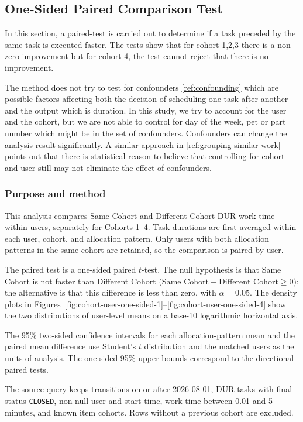 \subsection{One-Sided Paired Comparison Test} \label{cohort-user-one-sided-comparison}
In this section, a paired-test is carried out to determine if a task
preceded by the same task is executed faster.  The tests show that for
cohort 1,2,3 there is a non-zero improvement but for cohort 4, the
test cannot reject that there is no improvement.

The method does not try to test for confounders \ref{ref:confounding}
which are possible factors affecting both the decision of scheduling
one task after another and the output which is duration. In this
study, we try to account for the user and the cohort, but we are not
able to control for day of the week, pet or part number which might be
in the set of confounders. Confounders can change the analysis result
significantly.  A similar approach in \ref{ref:grouping-similar-work}
points out that there is statistical reason to believe that
controlling for cohort and user still may not eliminate the effect of
confounders.

\subsubsection{Purpose and method}
This analysis compares Same Cohort and Different Cohort DUR work time within
users, separately for Cohorts 1--4. Task durations are first averaged within
each user, cohort, and allocation pattern. Only users with both allocation
patterns in the same cohort are retained, so the comparison is paired by user.

The paired test is a one-sided paired $t$-test. The null hypothesis is that
Same Cohort is not faster than Different Cohort
($\text{Same Cohort}-\text{Different Cohort}\geq 0$); the alternative is
that this difference is less than zero, with $\alpha=0.05$. The density
plots in Figures~\ref{fig:cohort-user-one-sided-1}--\ref{fig:cohort-user-one-sided-4}
show the two distributions of user-level means on a base-10 logarithmic
horizontal axis.

The 95\% two-sided confidence intervals for each allocation-pattern mean and
the paired mean difference use Student's $t$ distribution and the matched
users as the units of analysis. The one-sided 95\% upper bounds correspond to
the directional paired tests.

The source query keeps transitions on or after 2026-08-01, DUR tasks with
final status \texttt{CLOSED}, non-null user and start time, work time between
0.01 and 5 minutes, and known item cohorts. Rows without a previous cohort
are excluded.

